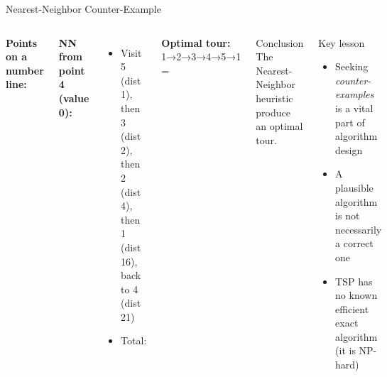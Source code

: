 \documentclass[aspectratio=169]{beamer}
\begin{document}
\begin{frame}[shrink=12]{Nearest-Neighbor Counter-Example}
  \setlength{\hfuzz}{1pt}
  \raggedright\sloppy
  \begin{columns}[T]
      \textbf{Points on a number line:}
      \vspace{0.5em}


      \vspace{0.5em}
      \textbf{NN from point 4 (value 0):}
      \begin{itemize}
        \item Visit 5 (dist 1), then 3 (dist 2), then 2 (dist 4),
              then 1 (dist 16), back to 4 (dist 21)
        \item Total: 
      \end{itemize}
      {\scriptsize\textbf{Optimal tour:} 1→2→3→4→5→1 =
      }
      \begin{alertblock}{Conclusion}
        The Nearest-Neighbor heuristic 
        produce an optimal tour.
      \end{alertblock}
      \vspace{0.5em}
      \begin{block}{Key lesson}
        \begin{itemize}
          \item Seeking \emph{counter-examples} is a vital part
                of algorithm design
          \item A plausible algorithm is not necessarily a
                correct one
          \item TSP has no known efficient exact algorithm
                (it is NP-hard)
        \end{itemize}
      \end{block}
  \end{columns}
\end{frame}
\end{document}
